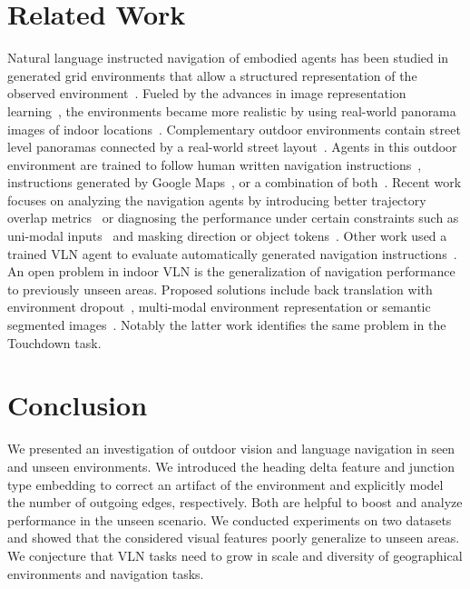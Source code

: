 \documentclass[11pt]{article}
\begin{document}
\section{Related Work}
Natural language instructed navigation of embodied agents has been studied in generated grid environments that allow a structured representation of the observed environment~\cite{walkthetalk, interpret_nlni}. Fueled by the advances in image representation learning~\cite{resnet}, the environments became more realistic by using real-world panorama images of indoor locations~\cite{room2room, rxr}. Complementary outdoor environments contain street level panoramas connected by a real-world street layout~\cite{city_without_map, Chen2018Touchdown, Mehta2020Retouchdown}. Agents in this outdoor environment are trained to follow human written navigation instructions~\cite{Chen2018Touchdown, Xiang2020LearningNavigation}, instructions generated by Google Maps~\cite{directions_in_streetview}, or a combination of both~\cite{Zhu2020MultimodalNavigation}. Recent work focuses on analyzing the navigation agents by introducing better trajectory overlap metrics~\cite{jain-etal-2019-stay, ndtw} or diagnosing the performance under certain constraints such as uni-modal inputs~\cite{Thomason2019ShiftingTB} and masking direction or object tokens~\cite{what_really_matters}. Other work used a trained VLN agent to evaluate automatically generated navigation instructions~\cite{zhao-etal-2021-evaluation}. An open problem in indoor VLN is the generalization of navigation performance to previously unseen areas. Proposed solutions include back translation with environment dropout~\cite{tan-etal-2019-learning}, multi-modal environment representation \cite{hu-etal-2019-looking} or semantic segmented images~\cite{Zhang2020DiagnosingNavigation}. Notably the latter work identifies the same problem in the Touchdown task.

\section{Conclusion}
We presented an investigation of outdoor vision and language navigation in seen and unseen environments. We introduced the heading delta feature and junction type embedding to correct an artifact of the environment and explicitly model the number of outgoing edges, respectively. Both are helpful to boost and analyze performance in the unseen scenario. We conducted experiments on two datasets and showed that the considered visual features poorly generalize to unseen areas. We conjecture that VLN tasks need to grow in scale and diversity of geographical environments and navigation tasks.
\end{document}
